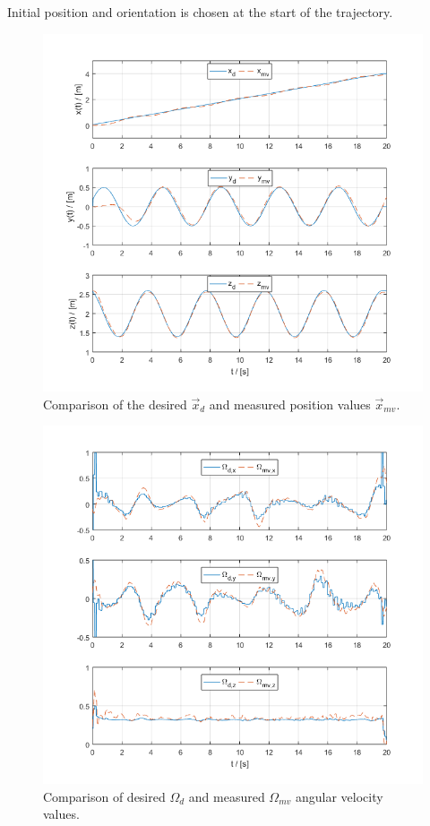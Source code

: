 \noindent Initial position and orientation is chosen at the start of the trajectory.

\begin{figure}[h!]
	\centering
	\includegraphics[width=\columnwidth]{./pictures/mmc_traj_pos.png}
	\caption{Comparison of the desired $\vec{x}_d$ and measured position values $\vec{x}_{mv}$.}
	\label{fig:traj_pos}
\end{figure}

\begin{figure}[h!]
	\centering
	\includegraphics[width=\columnwidth]{./pictures/mmc_traj_omega.png}
	\caption{Comparison of desired $\Omega_d$ and measured $\Omega_{mv}$ angular velocity values.}
	\label{fig:traj_omega}
\end{figure}

